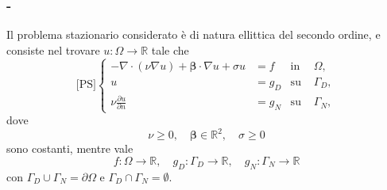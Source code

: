 \documentclass[11pt]{beamer}
\newcommand{\derP}[2]{\frac{\partial#1}{\partial#2}}
\begin{document}
            \begin{frame}\frametitle{\insertpart{} - \insertsection{}}

        
                Il problema stazionario considerato è di natura ellittica del secondo ordine, e consiste nel trovare $u\colon\Omega\rightarrow\mathbb R$ tale che
                \begin{equation}
                    \text{[PS]}
                    \left\{
                    \begin{aligned}
                        -\nabla\cdot(\nu\nabla u)+\boldsymbol\beta\cdot\nabla u + \sigma u
                                   &=f                &\text{in }&\Omega  ,\\
                        u          &=g_D              &\text{su }&\Gamma_D,\\
                        \nu \derP un&=g_N              &\text{su }&\Gamma_N,
                    \end{aligned}
                    \right.
                    \label{eqProblemaStazionario}
                \end{equation}
                dove
                \begin{equation*}
                    \nu\ge0,\quad
                    \boldsymbol\beta\in\mathbb R^2,\quad
                    \sigma\ge0
                \end{equation*}
                sono costanti, mentre vale
                \begin{equation*}
                       f\colon\Omega\to\mathbb R,\quad
                       g_D\colon\Gamma_D\to\mathbb R,\quad
                       g_N\colon\Gamma_N\to\mathbb R
                \end{equation*}
                con $\Gamma_D\cup\Gamma_N=\partial\Omega$ e $\Gamma_D\cap\Gamma_N=\emptyset$.                
            \end{frame}
            
\end{document}
